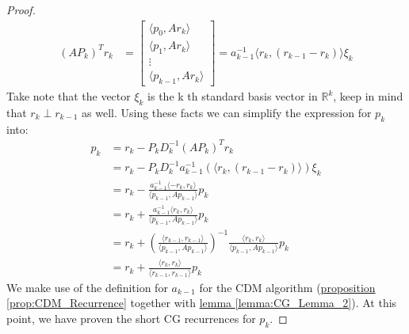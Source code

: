 \documentclass[]{article}
\theoremstyle{definition}
\begin{document}
\begin{proof}
                \begin{align}
                    (AP_k)^Tr_k &= 
                    \begin{bmatrix}
                        \langle p_0, Ar_k\rangle
                        \\
                        \langle p_1, Ar_k\rangle
                        \\
                        \vdots
                        \\
                        \langle p_{k - 1}, Ar_k\rangle
                    \end{bmatrix}
                    = 
                    a_{k - 1}^{-1}\langle r_k, (r_{k - 1} - r_{k})\rangle \xi_k
                \end{align}
                Take note that the vector $\xi_k$ is the k th standard basis vector in $\mathbb{R}^k$, keep in mind that $r_k\perp r_{k - 1}$ as well. Using these facts we can simplify the expression for $p_k$ into: 
                \begin{align}
                    p_k &= r_k - P_kD^{-1}_k(AP_k)^Tr_k
                    \\
                    &= r_k - P_kD_k^{-1}a_{k - 1}^{-1}(\langle r_k, (r_{k - 1} - r_{k})\rangle) \xi_k
                    \\
                    &= 
                    r_k - \frac{a_{k -1}^{-1}\langle -r_k, r_k\rangle}
                    {\langle p_{k - 1}, Ap_{k - 1}\rangle}p_k
                    \\
                    &= r_k + \frac{a_{k -1}^{-1}\langle r_k, r_k\rangle}
                    {\langle p_{k - 1}, Ap_{k - 1}\rangle}p_k
                    \\
                    &= r_k + 
                    \left(
                        \frac{\langle r_{k - 1}, r_{k - 1}\rangle}{\langle p_{k - 1}, Ap_{k - 1}\rangle}
                    \right)^{-1}
                    \frac{\langle r_k, r_k\rangle}{\langle p_{k - 1}, Ap_{k - 1}\rangle}p_k
                    \\
                    &= 
                    r_k + \frac{\langle r_k, r_k\rangle}{\langle r_{k - 1}, r_{k - 1}\rangle}p_k
                \end{align}
                We make use of the definition for $a_{k-1}$ for the CDM algorithm (\hyperref[prop:CDM_Recurrence]{proposition \ref*{prop:CDM_Recurrence}} together with \hyperref[lemma:CG_Lemma_2]{lemma \ref*{lemma:CG_Lemma_2}}). At this point, we have proven the short CG recurrences for $p_k$. 
            \end{proof}
\end{document}
